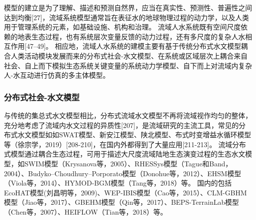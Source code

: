 

模型的建立是为了理解、描述和预测自然界，应当在真实性、预测性、普遍性之间达到均衡[27]，流域系统模型通常旨在表征水的地球物理过程的动力学，以及人类用于管理系统的元素，如基础设施、机构和治理。 %
流域人水系统既有空间尺度依赖的地表生态过程，也有系统层次变量反馈的动力过程，还有多尺度的复杂人水相互作用[47–49]。
相应地，流域人水系统的建模主要有基于传统分布式水文模型耦合人类活动模块发展而来的分布式社会-水文模型、在系统或区域层次上耦合来自社会、自上而下模拟生态系统关键变量的系统动力学模型、自下而上对流域内复杂人-水互动进行仿真的多主体模型。

\subsubsection*{分布式社会-水文模型}

与传统的集总式水文模型相比，分布式流域水文模型不再将流域视作均匀的整体，充分地考虑了流域内水文过程的异质性[207]，是流域研究的主流工具，常见的分布式水文模型如如SWAT模型、新安江模型、陕北模型、布式时变增益水循环模型等（徐宗学，2019）[208-210]，在国内外都得到了大量应用[211-213]。 %
流域分布式模型通过耦合生态过程，可用于描述大尺度流域陆地生态演变过程的生态水文模型，如SWIM模型（Krysanova等，2005）、RHESSys模型（Tague和Band，2004）、Budyko–Choudhury–Porporato模型（Donohue等，2012）、EHSM模型（Viola等，2014）、HYMOD-BGM模型（Tang等，2018）等。
国内的包括EcoHAT模型(刘昌明等，2009)、WEP-IBIS模型（Cao等，2015）、CLM-GBHM模型（Jiao等，2017）、GBEHM模型（Qin等，2017）、BEPS-TerrainLab模型（Chen等，2007）、HEIFLOW（Tian等，2018）等。

